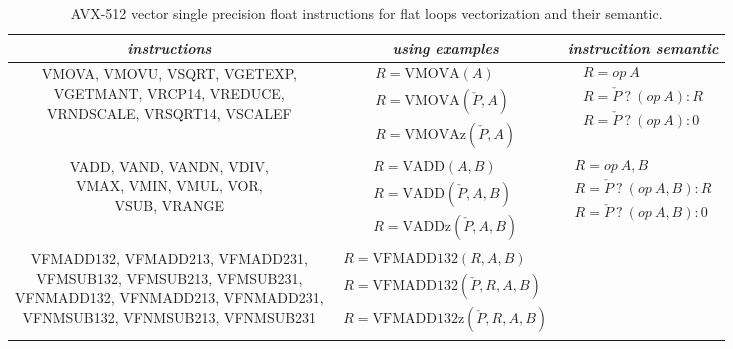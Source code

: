 \documentclass[
11pt,%
tightenlines,%
twoside,%
onecolumn,%
nofloats,%
nobibnotes,%
nofootinbib,%
superscriptaddress,%
noshowpacs,%
centertags]%
{revtex4}
\begin{document}
\begin{table}[!h]
\label{tbl:avx512semantic}
\setcaptionmargin{0mm}
\onelinecaptionsfalse
{}
\caption{AVX-512 vector single precision float instructions for flat loops vectorization and their semantic.}
\bigskip
\begin{tabular}{|c|c|c|}
\hline
\textit{instructions} & \textit{using examples} & \textit{instrucition semantic} \\
\hline
\parbox{8cm}{VMOVA, VMOVU, VSQRT, VGETEXP, \\ VGETMANT, VRCP14, VREDUCE, \\ VRNDSCALE, VRSQRT14, VSCALEF}
& $\begin{matrix} R = \text{VMOVA}(A) \\ R = \text{VMOVA}(\check{P}, A) \\ R = \text{VMOVAz}(\check{P}, A) \end{matrix}$
& $\begin{matrix} R = op \ A \\ R = \check{P} \ ? \ (op \ A) : R \\ R = \check{P} \ ? \ (op \ A) : 0 \end{matrix}$ \\
\hline
\parbox{8cm}{VADD, VAND, VANDN, VDIV, \\ VMAX, VMIN, VMUL, VOR, \\ VSUB, VRANGE}
& $\begin{matrix} R = \text{VADD}(A, B) \\ R = \text{VADD}(\check{P}, A, B) \\ R = \text{VADDz}(\check{P}, A, B) \end{matrix}$ 
& $\begin{matrix} R = op \ A, B \\ R = \check{P} \ ? \ (op \ A, B) : R \\ R = \check{P} \ ? \ (op \ A, B) : 0 \end{matrix}$ \\
\hline
\parbox{8cm}{VFMADD132, VFMADD213, VFMADD231, \\ VFMSUB132, VFMSUB213, VFMSUB231, \\ VFNMADD132, VFNMADD213, VFNMADD231, \\ VFNMSUB132, VFNMSUB213, VFNMSUB231}
& $\begin{matrix} R = \text{VFMADD132}(R, A, B) \\ R = \text{VFMADD132}(\check{P}, R, A, B) \\ R = \text{VFMADD132z}(\check{P}, R, A, B) \end{matrix}$

\end{tabular}
\end{table}
\end{document}
